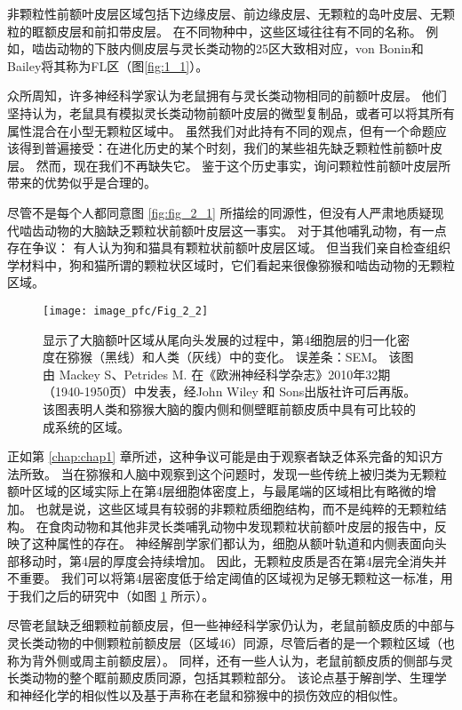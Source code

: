 非颗粒性前额叶皮层区域包括下边缘皮层、前边缘皮层、无颗粒的岛叶皮层、无颗粒的眶额皮层和前扣带皮层。
在不同物种中，这些区域往往有不同的名称。
例如，啮齿动物的下肢内侧皮层与灵长类动物的25区大致相对应，von Bonin和Bailey将其称为FL区（图\ref{fig:1_1}）。


众所周知，许多神经科学家认为老鼠拥有与灵长类动物相同的前额叶皮层。
他们坚持认为，老鼠具有模拟灵长类动物前额叶皮层的微型复制品，或者可以将其所有属性混合在小型无颗粒区域中\cite{kolb2007all,seamans2008comparing,schoenbaum2009new}。
虽然我们对此持有不同的观点，但有一个命题应该得到普遍接受：在进化历史的某个时刻，我们的某些祖先缺乏颗粒性前额叶皮层。
然而，现在我们不再缺失它。
鉴于这个历史事实，询问颗粒性前额叶皮层所带来的优势似乎是合理的。


尽管不是每个人都同意图 \ref{fig:fig_2_1} 所描绘的同源性，但没有人严肃地质疑现代啮齿动物的大脑缺乏颗粒状前额叶皮层这一事实。
对于其他哺乳动物，有一点存在争议：
有人认为狗\cite{rajkowska1988intrinsic}和猫\cite{je1948orbitofrontal}具有颗粒状前额叶皮层区域。
但当我们亲自检查组织学材料中，狗和猫所谓的颗粒状区域时，它们看起来很像猕猴和啮齿动物的无颗粒区域。


\begin{figure}[!htb]
	\centering
	\texttt{[image: image\_pfc/Fig\_2\_2]}
	\caption{显示了大脑额叶区域从尾向头发展的过程中，第4细胞层的归一化密度在猕猴（黑线）和人类（灰线）中的变化。
		误差条：SEM。
		该图由 Mackey S、Petrides M. 在《欧洲神经科学杂志》2010年32期（1940-1950页）中发表，经John Wiley 和 Sons出版社许可后再版。
		该图表明人类和猕猴大脑的腹内侧和侧壁眶前额皮质中具有可比较的成系统的区域。\label{fig:fig_2_2}}
\end{figure}


正如第 \ref{chap:chap1} 章所述，这种争议可能是由于观察者缺乏体系完备的知识方法所致。
当在猕猴和人脑中观察到这个问题时\cite{mackey2010quantitative}，发现一些传统上被归类为无颗粒额叶区域的区域实际上在第4层细胞体密度上，与最尾端的区域相比有略微的增加。
也就是说，这些区域具有较弱的非颗粒质细胞结构，而不是纯粹的无颗粒结构。
在食肉动物和其他非灵长类哺乳动物中发现颗粒状前额叶皮层的报告中，反映了这种属性的存在。
神经解剖学家们都认为，细胞从额叶轨道和内侧表面向头部移动时，第4层的厚度会持续增加。
因此，无颗粒皮质是否在第4层完全消失并不重要。
我们可以将第4层密度低于给定阈值的区域视为足够无颗粒这一标准，用于我们之后的研究中（如图 \ref{fig:fig_2_2} 所示）。


尽管老鼠缺乏细颗粒前额皮层，但一些神经科学家仍认为，老鼠前额皮质的中部与灵长类动物的中侧颗粒前额皮层（区域46）同源\cite{kolb2007all}，尽管后者的是一个颗粒区域（也称为背外侧或周主前额皮层）。
同样，还有一些人认为，老鼠前额皮质的侧部与灵长类动物的整个眶前颞皮质同源，包括其颗粒部分\cite{kolb2007all,schoenbaum2009new}。
该论点基于解剖学、生理学和神经化学的相似性以及基于声称在老鼠和猕猴中的损伤效应的相似性。


